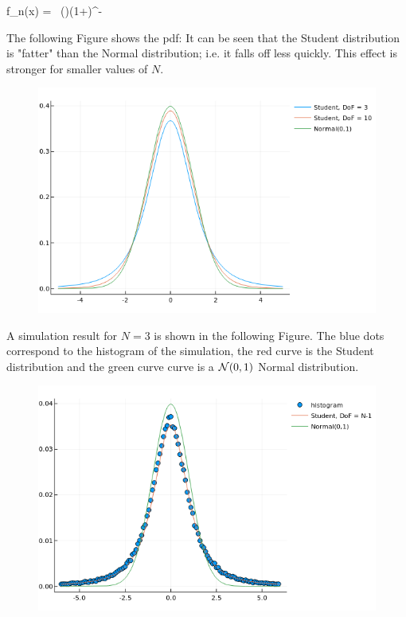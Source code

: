 \bee
f_n(x) =  {~\Gamma\left(\right)}\left(1+\right)^{-}
\eee

The following Figure shows the pdf: It can be seen that the Student distribution is "fatter" than the Normal distribution; i.e. it falls off less quickly. This effect is stronger for smaller values of $N$.

\begin{figure}[hbt!]
\centering
\includegraphics[scale=0.65]{images/Student_2.png}
\end{figure}


A simulation result for $N=3$ is shown in the following Figure. The blue dots correspond to the histogram of the simulation, the red curve is the Student distribution and the green curve curve is a $\mathcal{N}(0,1)$ Normal distribution.

\begin{figure}[hbt!]
\centering
\includegraphics[scale=0.65]{images/Student_1.png}
\end{figure}

